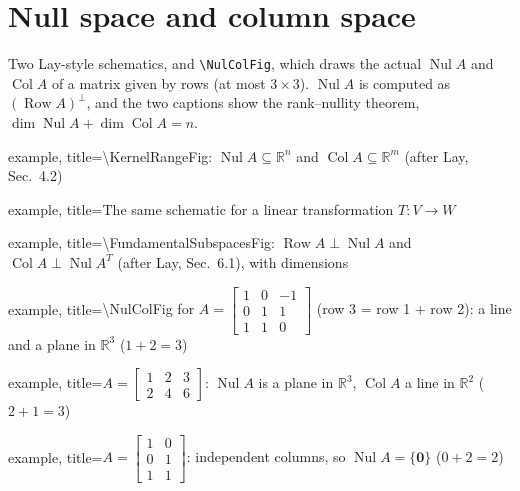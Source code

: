 \documentclass[11pt]{article}
\begin{document}
\section*{Null space and column space}

Two Lay-style schematics, and \verb|\NulColFig|, which draws the actual
$\operatorname{Nul} A$ and $\operatorname{Col} A$ of a matrix given by
rows (at most $3 \times 3$). $\operatorname{Nul} A$ is computed as
$(\operatorname{Row} A)^\perp$, and the two captions show the
rank--nullity theorem, $\dim \operatorname{Nul} A + \dim
\operatorname{Col} A = n$.

\begin{tcblisting}{example, title={\textbackslash KernelRangeFig:
    $\operatorname{Nul} A \subseteq \mathbb{R}^n$ and
    $\operatorname{Col} A \subseteq \mathbb{R}^m$ (after Lay, Sec.~4.2)}}
\KernelRangeFig
\end{tcblisting}

\begin{tcblisting}{example, title={The same schematic for a linear
    transformation $T \colon V \to W$}}
\KernelRangeFig[domain=$V$, codomain=$W$, kernel={$\ker T$},
                range={$\operatorname{range} T$}, map label={$T$},
                image={$T(\mathbf{x})$}]
\end{tcblisting}

\begin{tcblisting}{example, title={\textbackslash FundamentalSubspacesFig:
    $\operatorname{Row} A \perp \operatorname{Nul} A$ and
    $\operatorname{Col} A \perp \operatorname{Nul} A^T$ (after Lay,
    Sec.~6.1), with dimensions}}
\FundamentalSubspacesFig[dims]
\end{tcblisting}

\begin{tcblisting}{example, title={\textbackslash NulColFig for
    $A = \left[\begin{smallmatrix} 1&0&-1\\ 0&1&1\\ 1&1&0
    \end{smallmatrix}\right]$ (row 3 = row 1 + row 2): a line and a
    plane in $\mathbb{R}^3$ ($1 + 2 = 3$)}}
\end{tcblisting}

\begin{tcblisting}{example, title={$A = \left[\begin{smallmatrix} 1&2&3\\
    2&4&6 \end{smallmatrix}\right]$: $\operatorname{Nul} A$ is a plane in
    $\mathbb{R}^3$, $\operatorname{Col} A$ a line in $\mathbb{R}^2$
    ($2 + 1 = 3$)}}
\end{tcblisting}

\begin{tcblisting}{example, title={$A = \left[\begin{smallmatrix} 1&0\\
    0&1\\ 1&1 \end{smallmatrix}\right]$: independent columns, so
    $\operatorname{Nul} A = \{\mathbf{0}\}$ ($0 + 2 = 2$)}}
\end{tcblisting}
\end{document}
